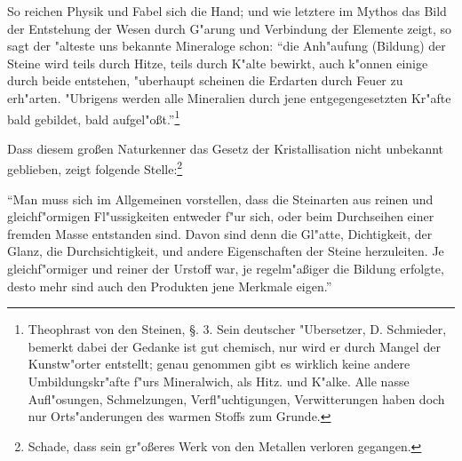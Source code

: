\documentclass[a4paper, 11pt, oneside, polutonikogreek, german]{article}
\begin{document}
So reichen Physik und Fabel sich die Hand; und wie letztere im Mythos das Bild der Entstehung der Wesen durch G"arung und Verbindung der Elemente zeigt, so sagt der "alteste uns bekannte Mineraloge schon: "`die Anh"aufung (Bildung) der Steine wird teils durch Hitze, teils durch K"alte bewirkt, auch k"onnen einige durch beide entstehen, "uberhaupt scheinen die Erdarten durch Feuer zu erh"arten. "Ubrigens werden alle Mineralien durch jene entgegengesetzten Kr"afte bald gebildet, bald aufgel"oßt."'\footnote{Theophrast von den Steinen, §. 3. Sein deutscher "Ubersetzer, D. Schmieder, bemerkt dabei der Gedanke ist gut chemisch, nur wird er durch Mangel der Kunstw"orter entstellt; genau genommen gibt es wirklich keine andere Umbildungskr"afte f"urs Mineralwich, als Hitz. und K"alke. Alle nasse Aufl"osungen, Schmelzungen, Verfl"uchtigungen, Verwitterungen haben doch nur Orts"anderungen des warmen Stoffs zum Grunde.}

Dass diesem großen Naturkenner das Gesetz der Kristallisation nicht unbekannt geblieben, zeigt folgende Stelle:\footnote{Schade, dass sein gr"oßeres Werk von den Metallen verloren gegangen.}

"`Man muss sich im Allgemeinen vorstellen, dass die Steinarten aus reinen und gleichf"ormigen Fl"ussigkeiten entweder f"ur sich, oder beim Durchseihen einer fremden Masse entstanden sind. Davon sind denn die Gl"atte, Dichtigkeit, der Glanz, die Durchsichtigkeit, und andere Eigenschaften der Steine herzuleiten. Je gleichf"ormiger und reiner der Urstoff war, je regelm"aßiger die Bildung erfolgte, desto mehr sind auch den Produkten jene Merkmale eigen."'
\end{document}
